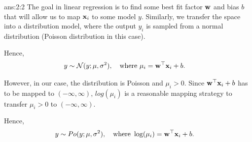 \documentclass{tron}
\begin{document}
\newpage
\begin{answer}{ans:2:2}
	The goal in linear regression is to find some best fit factor $\mathbf{w}$ and bias $b$ that will allow us to map $\mathbf{x}_i$ to some model $y$. Similarly, we transfer the space into a distribution model, where the output $y_i$ is sampled from a normal distribution (Poisson distribution in this case). 
	
	Hence, 
	\begin{align}
		y \sim \mathcal{N}(y; \mu, \sigma^2), \quad \text{where } \mu_i &= \mathbf{w}^\top \mathbf{x}_i + b.
	\end{align}
	
	However, in our case, the distribution is Poisson and $\mu_i > 0$. Since $\mathbf{w}^\top \mathbf{x}_i + b$ has to be mapped to $(-\infty, \infty)$, $log(\mu_i)$ is a reasonable mapping strategy to transfer $\mu_i > 0$ to $(-\infty, \infty)$. 
	
	Hence,
	\begin{align}
		y \sim Po(y; \mu, \sigma^2), \quad \text{where } \log(\mu_i) &= \mathbf{w}^\top \mathbf{x}_i + b.
	\end{align}

\end{answer}
\end{document}
